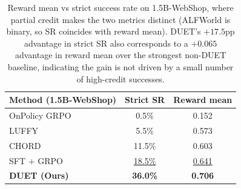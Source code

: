 %

\begin{table}[h]
\centering
\small
\setlength{\tabcolsep}{8pt}
\renewcommand{\arraystretch}{1.15}
\begin{tabular}{lcc}
\toprule
\textbf{Method (1.5B-WebShop)} & \textbf{Strict SR} & \textbf{Reward mean} \\
\midrule
OnPolicy GRPO & \phantom{0}0.5\% & 0.152 \\
LUFFY         & \phantom{0}5.5\% & 0.573 \\
CHORD         & 11.5\%           & 0.603 \\
SFT $+$ GRPO  & \underline{18.5\%} & \underline{0.641} \\
\midrule
\rowcolor{gray!12}
\textbf{DUET (Ours)} & \textbf{36.0\%} & \textbf{0.706} \\
\bottomrule
\end{tabular}
\caption{Reward mean vs strict success rate on 1.5B-WebShop, where partial credit makes the two metrics distinct (ALFWorld is binary, so SR coincides with reward mean). DUET's $+17.5$pp advantage in strict SR also corresponds to a $+0.065$ advantage in reward mean over the strongest non-DUET baseline, indicating the gain is not driven by a small number of high-credit successes.}
\label{tab:main_results_extended}
\end{table}
